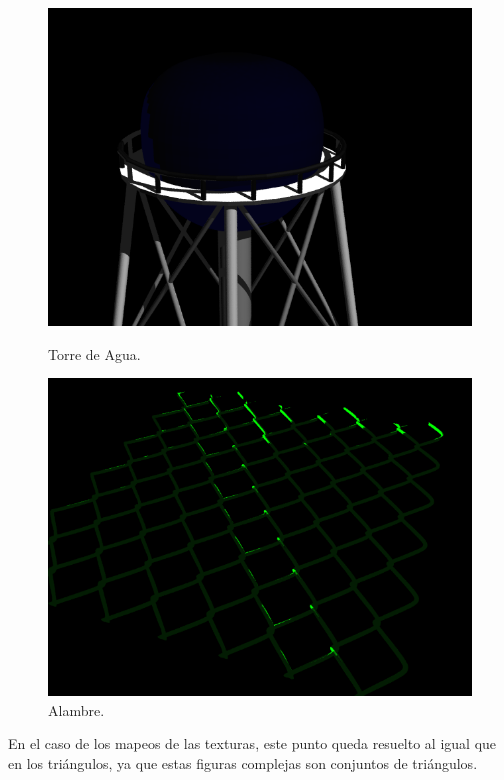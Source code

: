 \documentclass[a4paper,10pt]{article}
\begin{document}
\begin{figure}[ht]
\begin{minipage}[b]{0.5\linewidth}
\centering
\includegraphics[scale=0.25]{watertower.png}
\caption{Torre de Agua.}
\label{fig:figure5}
\end{minipage}
\hspace{0.5cm}
\begin{minipage}[b]{0.5\linewidth}
\centering
\includegraphics[scale=0.25]{chainlink.png}
\caption{Alambre.}
\label{fig:figure6}
\end{minipage}
\end{figure}

En el caso de los mapeos de las texturas, este punto queda resuelto al igual
que en los tri\'angulos, ya que estas figuras complejas son conjuntos de
tri\'angulos.
\end{document}
